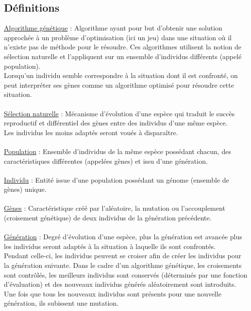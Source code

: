 \documentclass[12pt]{report}
\begin{document}
	\subsection{Définitions}
	\singlespacing
	\underline{Algorithme génétique} : Algorithme ayant pour but d'obtenir une solution approchée
	à un problème d'optimisation (ici un jeu) dans une situation où il n'existe pas de méthode
	pour le résoudre. Ces algorithmes utilisent la notion de sélection naturelle et l'appliquent sur un ensemble d'individus différents (appelé population).\\Lorsqu'un individu semble correspondre à la situation dont il est confronté, on peut interpréter ses gènes comme un algorithme optimisé pour résoudre cette situation.\\\\
	\underline{Sélection naturelle} : Mécanisme d'évolution d'une espèce qui traduit le succès
	\\reproductif et différentiel des gènes entre des individus d'une même espèce.\\Les individus les moins adaptés seront voués à disparaître.\\\\
	\underline {Population} : Ensemble d'individus de la même espèce possédant chacun, des
	\\caractéristiques différentes (appelées gènes) et issu d'une génération.\\\\
	\underline{Individu} : Entité issue d'une population possédant un génome (ensemble de gènes) unique.\\\\
	\underline{Gènes} : Caractéristique créé par l'aléatoire, la mutation ou l'accouplement (croisement génétique) de deux individus de la génération précédente.\\\\
	\underline{Génération} : Degré d'évolution d'une espèce, plus la génération est avancée plus les individus seront adaptés à la situation à laquelle ils sont confrontés.
	\\Pendant celle-ci, les individus peuvent se croiser afin de créer les individus pour la génération suivante. Dans le cadre d'un algorithme génétique, les croisements sont contrôlés, les meilleurs individus sont conservés (déterminés par une fonction d'évaluation) et des nouveaux individus générés aléatoirement sont introduits.\\Une fois que tous les nouveaux individus sont présents pour une nouvelle génération, ils subissent une mutation.\\\\
\end{document}

